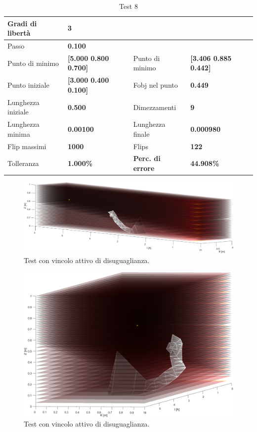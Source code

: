\documentclass[a4paper, 11pt]{article}
\begin{document}
\begin{table}[h]
    \caption{Test 8}
    \begin{center}
    \begin{tabular}{|l|l|l|l|} 
    \hline 
Gradi di libertà & \textbf{3} &  &  \\ \hline 
Passo & \textbf{0.100} &  &  \\ \hline 
Punto di minimo & \textbf{{[}5.000 0.800 0.700{]}} & Punto di minimo &
\textbf{{[}3.406 0.885 0.442{]}} \\ \hline 
Punto iniziale & \textbf{{[}3.000 0.400 0.100{]}} & Fobj nel punto &
\textbf{0.449} \\ \hline 
Lunghezza iniziale & \textbf{0.500} & Dimezzamenti & \textbf{9} \\ \hline 
Lunghezza minima & \textbf{0.00100} & Lunghezza finale & \textbf{0.000980} \\
\hline
Flip massimi & \textbf{1000} & Flips & \textbf{122} \\ \hline 
Tolleranza & \textbf{1.000\%} & \textbf{Perc. di errore} & \textbf{44.908\%} \\
\hline 
    \end{tabular}
    \end{center}
    \end{table}

\begin{figure}[H]
    \centering
        \includegraphics[width=16cm]{assets/figure8}
        \caption{Test con vincolo attivo di disuguaglianza.}
\end{figure}
\noindent

\begin{figure}[H]
    \centering
        \includegraphics[width=13cm]{assets/figure9}
        \caption{Test con vincolo attivo di disuguaglianza.}
\end{figure}
\end{document}
